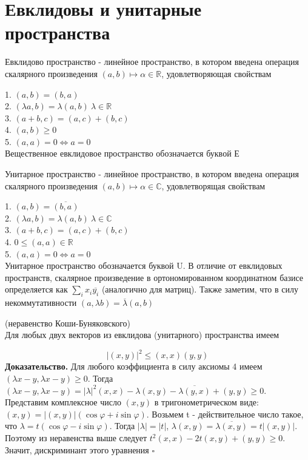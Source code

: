 \section{Евклидовы и унитарные пространства}
\begin{defin}
Евклидово пространство - линейное пространство,  в котором введена операция
скалярного произведения $(a,b)\mapsto\alpha\in\mathbb R$, удовлетворяющая 
свойствам
\end{defin}
1. $(a,b)=(b,a)$\\
2. $(\lambda a,b)=\lambda(a,b)~\lambda\in\mathbb R$\\
3. $(a+b,c)=(a,c)+(b,c)$\\
4. $(a,b)\geqslant0$\\
5. $(a,a)=0\Leftrightarrow a=0$\\
Вещественное евклидовое пространство обозначается буквой Е
\begin{defin}
Унитарное пространство - линейное пространство, в котором введена операция 
скалярного произведения $(a,b)\mapsto\alpha\in\mathbb C$, удовлетворящая
свойствам
\end{defin}
1. $(a,b)=\overline{(b,a)}$\\
2. $(\lambda a,b)=\lambda(a,b)~\lambda\in\mathbb C$\\
3. $(a+b,c)=(a,c)+(b,c)$\\
4. $0\leqslant(a,a)\in\mathbb R$\\
5. $(a,a)=0\Leftrightarrow a=0$\\
Унитарное пространство обозначается буквой U. В отличие от евклидовых
пространств, скалярное произведение в ортономированном координатном базисе
определяется как $\sum\limits_ix_i\overline{y_i}$ (аналогично для матриц). 
Также заметим, что в силу некоммутативности $(a,\lambda b)=\overline{\lambda}
(a,b)$
\begin{theor}(неравенство Коши-Буняковского)\\
Для любых двух векторов из евклидова (унитарного)
пространства имеем
\end{theor}
$$|(x,y)|^2\leqslant(x,x)(y,y)$$
\textbf{Доказательство.} Для любого коэффициента в силу аксиомы 4 имеем 
$(\lambda x-y,\lambda x-y)\geqslant0$. Тогда $(\lambda x-y,\lambda x-y)=
|\lambda|^2(x,x)-\lambda(x,y)-\overline{\lambda(y,x)}+(y,y)\geqslant0$.
Представим комплексное число $(x,y)$ в тригонометрическом виде: $(x,y)=|(x,y)|
(\cos\varphi+i\sin\varphi)$. Возьмем t -
действительное число такое, что $\lambda=t(\cos\varphi-i\sin\varphi)$. Тогда
$|\lambda|=|t|$,
$\lambda(x,y)=\overline{\lambda(x,y)}=t|(x,y)|$. Поэтому из неравенства выше
следует $t^2(x,x)-2t(x,y)+(y,y)\geqslant0$. Значит, дискриминант этого 
уравнения $\square$

